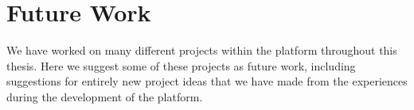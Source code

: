 






\section{Future Work}
\label{chap:future}

We have worked on many different projects within the {\rg} platform throughout this thesis.
Here we suggest some of these projects as future work, including suggestions for entirely new project ideas that we have made from the experiences during the development of the {\rg} platform.

